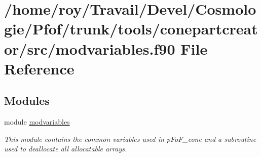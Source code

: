\hypertarget{tools_2conepartcreator_2src_2modvariables_8f90}{}\section{/home/roy/\+Travail/\+Devel/\+Cosmologie/\+Pfof/trunk/tools/conepartcreator/src/modvariables.f90 File Reference}
\label{tools_2conepartcreator_2src_2modvariables_8f90}
\subsection*{Modules}
\begin{DoxyCompactItemize}
\item 
module \hyperlink{namespacemodvariables}{modvariables}
\begin{DoxyCompactList}\small\item\em This module contains the common variables used in p\+Fo\+F\+\_\+cone and a subroutine used to deallocate all allocatable arrays. \end{DoxyCompactList}\end{DoxyCompactItemize}
